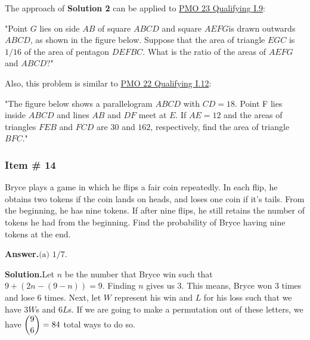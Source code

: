 \documentclass[11pt,paper=letter]{scrartcl}
\newcommand{\ans}[1]{{\sffamily \bfseries Answer.}\;\(\boxed{\text{#1}}\).}
\newcommand{\sol}{{\sffamily \bfseries Solution.}\;}
\newenvironment{rem}%
{\noindent \ignorespaces \small \sffamily  \sansmath {\bfseries \color{DarkMidnightBlue} Remark.}}%
{\ignorespacesafterend}
\begin{document}
\begin{mdframed}
\begin{rem}
The approach of \textbf{Solution 2} can be applied to \href{https://pmo.ph/wp-content/uploads/2021/02/PMO23-Qualifying-Round.pdf}{PMO 23 Qualifying I.9}: 

"Point $G$ lies on side $AB$ of square $ABCD$ and square $AEFG$is drawn outwards $ABCD$, as
shown in the figure below. Suppose that the area of triangle $EGC$ is $1/16$ of the area of
pentagon $DEFBC$. What is the ratio of the areas of $AEFG$ and $ABCD$?"

\end{rem}

\begin{rem} Also, this problem is similar to \href{https://pmo.ph/wp-content/uploads/2019/11/PMO-22-Qualifying-Round-with-answers.pdf}{PMO 22 Qualifying I.12}:

"The figure below shows a parallelogram $ABCD$ with $CD = 18$. Point F lies inside $ABCD$ and
lines $AB$ and $DF$ meet at $E$. If $AE = 12$ and the areas of triangles $FEB$ and $FCD$ are 30
and $162$, respectively, find the area of triangle $BFC$."
\end{rem}
\end{mdframed}

\subsubsection{Item \# 14}

\begin{probboxed}
\item Bryce plays a game in which he flips a fair coin repeatedly. In each flip, he obtains two tokens if the coin lands on heads, and loses one coin if it's tails. From the beginning, he has nine tokens. If after nine flips, he still retains the number of tokens he had from the beginning. Find the probability of Bryce having nine tokens at the end. 

\end{probboxed}

\ans{(a) 1/7}

\sol Let $n$ be the number that Bryce win such that $9 + \left(2n-(9-n)\right) = 9 $. Finding $n$ gives us 3. This means, Bryce won 3 times and lose 6 times. Next, let $W$ represent his win and $L$ for his loss such that we have 3$W$s and 6$L$s. If we are going to make a permutation out of these letters, we have $\dbinom{9}{6} = 84$ total ways to do so.
\end{document}
